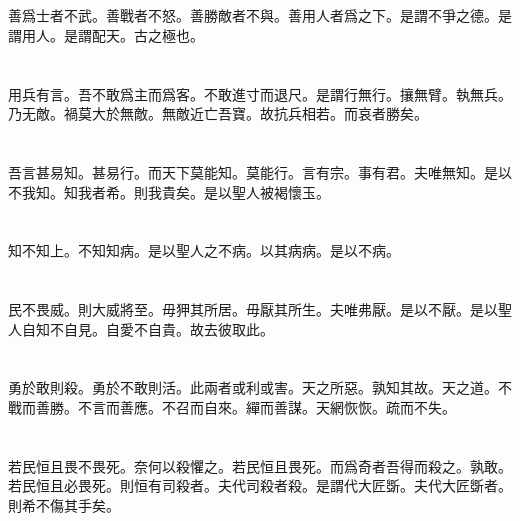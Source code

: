 \documentclass[a5paper]{ctexbook}
\begin{document}
    \chapter{}

    善爲士者不武。善戰者不怒。善勝敵者不與。善用人者爲之下。是謂不爭之德。是謂用人。是謂配天。古之極也。

    \chapter{}

    用兵有言。吾不敢爲主而爲客。不敢進寸而退尺。是謂行無行。攘無臂。執無兵。乃无敵。禍莫大於無敵。無敵近亡吾寶。故抗兵相若。而哀者勝矣。

    \chapter{}

    吾言甚易知。甚易行。而天下莫能知。莫能行。言有宗。事有君。夫唯無知。是以不我知。知我者希。則我貴矣。是以聖人被褐懷玉。

    \chapter{}

    知不知上。不知知病。是以聖人之不病。以其病病。是以不病。

    \chapter{}

    民不畏威。則大威將至。毋狎其所居。毋厭其所生。夫唯弗厭。是以不厭。是以聖人自知不自見。自愛不自貴。故去彼取此。

    \chapter{}

    勇於敢則殺。勇於不敢則活。此兩者或利或害。天之所惡。孰知其故。天之道。不戰而善勝。不言而善應。不召而自來。繟而善謀。天網恢恢。疏而不失。

    \chapter{}

    若民恒且畏不畏死。奈何以殺懼之。若民恒且畏死。而爲奇者吾得而殺之。孰敢。若民恒且必畏死。則恒有司殺者。夫代司殺者殺。是謂代大匠斲。夫代大匠斲者。則希不傷其手矣。
\end{document}
